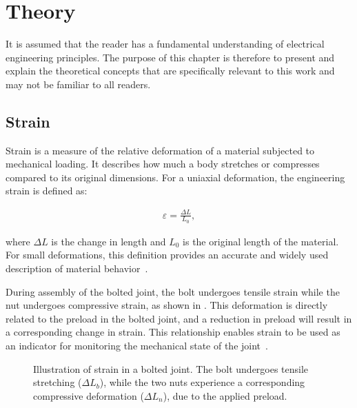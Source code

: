 \chapter{Theory} \label{sec:Theory}
It is assumed that the reader has a fundamental understanding of electrical engineering principles. The purpose of this chapter is therefore to present and explain the theoretical concepts that are specifically relevant to this work and may not be familiar to all readers.

\section{Strain} \label{sec:Strain}
Strain is a measure of the relative deformation of a material subjected to mechanical loading. It describes how much a body stretches or compresses compared to its original dimensions. For a uniaxial deformation, the engineering strain is defined as:

\begin{align} \label{eq:strain definition}
    \varepsilon=\frac{\Delta L}{L_{0}},
\end{align}

where $\Delta L$ is the change in length and $L_0$ is the original length of the material. For small deformations, this definition provides an accurate and widely used description of material behavior~\cite{metal_gauge}.

During assembly of the bolted joint, the bolt undergoes tensile strain while the nut undergoes compressive strain, as shown in . This deformation is directly related to the preload in the bolted joint, and a reduction in preload will result in a corresponding change in strain. This relationship enables strain to be used as an indicator for monitoring the mechanical state of the joint~\cite{Effects_of_preload_deficiency, StrainBand}.

\begin{figure}[h]
\centering

    \caption{Illustration of strain in a bolted joint. The bolt undergoes tensile stretching ($\Delta L_b$), while the two nuts experience a corresponding compressive deformation ($\Delta L_n$), due to the applied preload.}
    \label{fig:strain}
\end{figure}